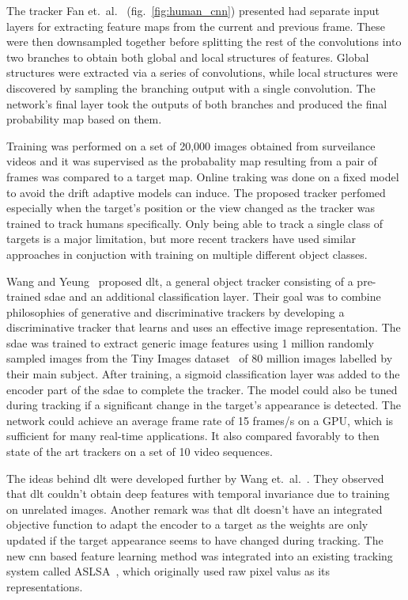 The tracker Fan et.~al.~\cite{HUMAN_CNN} (fig.~\ref{fig:human_cnn}) presented had separate
input layers for extracting feature maps from the current and previous frame. These were
then downsampled together before splitting the rest of the convolutions into two branches
to obtain both global and local structures of features. Global structures were extracted
via a series of convolutions, while local structures were discovered by sampling the
branching output with a single convolution. The network's final layer took the outputs of
both branches and produced the final probability map based on them.~\cite{HUMAN_CNN}

Training was performed on a set of 20,000 images obtained from surveilance videos and it
was supervised as the probabality map resulting from a pair of frames was compared to a
target map. Online traking was done on a fixed model to avoid the drift adaptive models
can induce. The proposed tracker perfomed especially when the target's position or the
view changed as the tracker was trained to track humans specifically. Only being able
to track a single class of targets is a major limitation, but more recent trackers have
used similar approaches in conjuction with training on multiple different object classes.~\cite{HUMAN_CNN}

Wang and Yeung~\cite{DLT} proposed \ac{dlt}, a general object tracker consisting of a
pre-trained \ac{sdae} and an additional classification layer. Their goal was to combine
philosophies of generative and discriminative trackers by developing a discriminative
tracker that learns and uses an effective image representation. The \ac{sdae} was
trained to extract generic image features using 1 million randomly sampled images from
the Tiny Images dataset~\cite{TINY_IMAGES} of 80 million images labelled by their main
subject. After training, a sigmoid classification layer was added to the encoder part
of the \ac{sdae} to complete the tracker. The model could also be tuned during tracking
if a significant change in the target's appearance is detected. The network could
achieve an average frame rate of 15 frames/s on a GPU, which is sufficient for many
real-time applications. It also compared favorably to then state of the art trackers
on a set of 10 video sequences.

The ideas behind \ac{dlt} were developed further by Wang et.~al.~\cite{LEARNED_HIERARCH}.
They observed that \ac{dlt} couldn't obtain deep features with temporal invariance due to
training on unrelated images. Another remark was that \ac{dlt} doesn't have an
integrated objective function to adapt the encoder to a target as the weights
are only updated if the target appearance seems to have changed during tracking.
The new \ac{cnn} based feature learning method was integrated into an existing tracking
system called ASLSA~\cite{ASLSA}, which originally used raw pixel valus as its representations.

